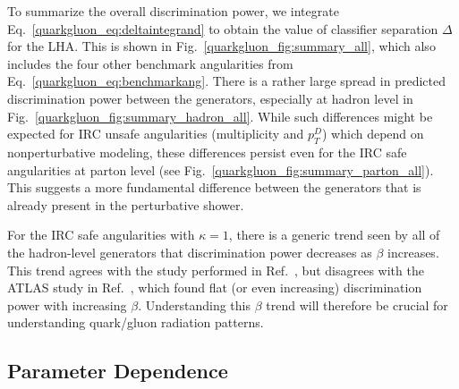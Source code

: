 \documentclass[11pt]{cernrep}
\begin{document}
To summarize the overall discrimination power, we integrate
Eq.~\eqref{quarkgluon_eq:deltaintegrand} to obtain the value of
classifier separation $\Delta$ for the LHA.  This is shown in
Fig.~\ref{quarkgluon_fig:summary_all}, which also includes the four
other benchmark angularities from
Eq.~\eqref{quarkgluon_eq:benchmarkang}.  There is a rather large
spread in predicted discrimination power between the generators,
especially at hadron level in
Fig.~\ref{quarkgluon_fig:summary_hadron_all}.  While such differences
might be expected for IRC unsafe angularities (multiplicity and
$p_T^D$) which depend on nonperturbative modeling, these differences
persist even for the IRC safe angularities at parton level (see
Fig.~\ref{quarkgluon_fig:summary_parton_all}).  This suggests a more
fundamental difference between the generators that is already present
in the perturbative shower.

For the IRC safe angularities with $\kappa = 1$, there is a generic trend seen by all of the hadron-level generators that discrimination power decreases as $\beta$ increases.  This trend agrees with the study performed in Ref.~\cite{Larkoski:2013eya}, but disagrees with the ATLAS study in Ref.~\cite{Aad:2014gea}, which found flat (or even increasing) discrimination power with increasing $\beta$.  Understanding this $\beta$ trend will therefore be crucial for understanding quark/gluon radiation patterns.

\subsection{Parameter Dependence}
\label{quarkgluon_sec:ee_scales}
\end{document}
